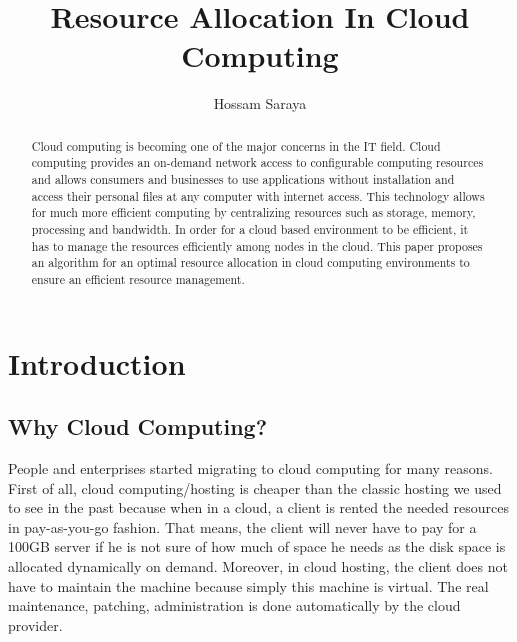 \documentclass{article}
\begin{document}
 
\nocite{*}
\begin{titlepage}
\title{Resource Allocation In Cloud Computing}
\author{ Hossam Saraya}
\maketitle

\vspace{100 pt}
\begin{abstract}
 Cloud computing is becoming one of the major concerns in the IT field. Cloud computing provides an on-demand network access to configurable computing resources and allows consumers and businesses to use applications without installation and access their personal files at any computer with internet access. This technology allows for much more efficient computing by centralizing resources such as storage, memory, processing and bandwidth. In order for a cloud based environment to be efficient, it has to manage the resources efficiently among nodes in the cloud. This paper proposes an algorithm for an optimal resource allocation in cloud computing environments to ensure an efficient resource management.
\end{abstract}
\end{titlepage}

\tableofcontents 
\newpage


\section{Introduction}
\subsection{Why Cloud Computing?}
People and enterprises started migrating to cloud computing for many reasons. First of all, cloud computing/hosting is cheaper than the classic hosting we used to see in the past because when in a cloud, a client is rented the needed resources in pay-as-you-go fashion. That means, the client will never have to pay for a 100GB server if he is not sure of how much of space he needs as the disk space is allocated dynamically on demand. Moreover, in cloud hosting, the client does not have to maintain the machine because simply this machine is virtual. The real maintenance, patching, administration is done automatically by the cloud provider. 
\end{document}
